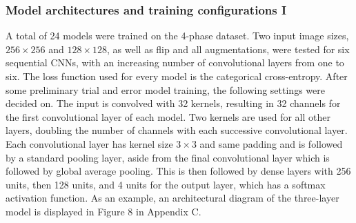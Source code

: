\documentclass[12pt]{article}
\begin{document}
\subsubsection{Model architectures and training configurations I}
A total of 24 models were trained on the 4-phase dataset. Two input image sizes, $256 \times 256$ and $128 \times 128$, as well as flip and all augmentations, were tested for six sequential CNNs, with an increasing number of convolutional layers from one to six.  The loss function used for every model is the categorical cross-entropy. After some preliminary trial and error model training, the following settings were decided on. The input is convolved with 32 kernels, resulting in 32 channels for the first convolutional layer of each model. Two kernels are used for all other layers, doubling the number of channels with each successive convolutional layer. Each convolutional layer has kernel size $3 \times 3$ and same padding and is followed by a standard pooling layer, aside from the final convolutional layer which is followed by global average pooling. This is then followed by dense layers with 256 units, then 128 units, and 4 units for the output layer, which has a softmax activation function. As an example, an architectural diagram of the three-layer model is displayed in Figure 8 in Appendix C.
\end{document}
